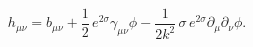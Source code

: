 \begin{equation}\label{substitution}
h_{\mu\nu}=b_{\mu\nu}+\frac{1}{2}\,e^{2\sigma}\gamma_{\mu\nu}\phi-
\frac{1}{2k^2}\,\sigma \,
e^{2\sigma}\partial_{\mu}\partial_{\nu}\phi.
\end{equation}

